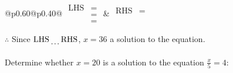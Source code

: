 \documentclass[12pt]{article}
\newcounter{minipagecount}
\begin{document}
\begin{multicols}{2}
\begin{minipage}[t]{0.40\textwidth}
    \noindent
    \renewcommand{\arraystretch}{1.3} %
    \begin{tabular}{@{}p{0.60\linewidth}@{}p{0.40\linewidth}@{}}
        \(\begin{aligned}
            \text{LHS} &=  \\
                    &=  \\
                    &= 
        \end{aligned}\) &
        \(\begin{aligned}
            \text{RHS} &= \\
                    & \\
                    &
        \end{aligned}\)
    \end{tabular}
    \renewcommand{\arraystretch}{1.0} %
    \vspace{2pt}  %

    \noindent \(\therefore\) Since \(\text{LHS} \dotuline{\hspace{5mm}} \text{RHS}\), \(x = 36\) \dotuline{\hspace{12mm}} a solution to the equation.

\end{minipage}

\vspace*{0.5ex}
\vfill{}
\noindent{(\theminipagecount)}\hspace{0.1mm} %
\begin{minipage}[t]{0.40\textwidth} %

    \noindent Determine whether \(x = 20\) is a solution to the equation \(\frac{x}{5} = 4\):
    \vspace{2pt}  %


\end{minipage}
\end{multicols}
\end{document}
